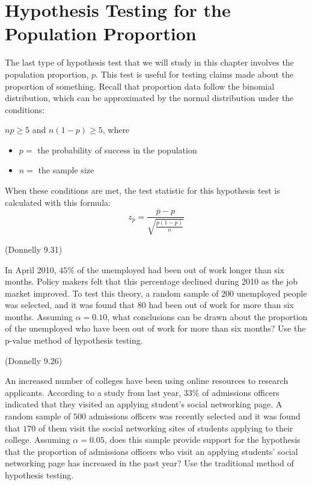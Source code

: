 \documentclass[12pt, letterpaper]{article}
\newcounter{exercise}
\theoremstyle{definition}
\begin{document}
\vfill

\newpage

\section*{Hypothesis Testing for the Population Proportion}

\noindent The last type of hypothesis test that we will study in this chapter involves the population proportion, $p$.  This test is useful for testing claims made about the proportion of something.  Recall that proportion data follow the binomial distribution, which can be approximated by the normal distribution under the conditions:
\begin{center}
$np\geq 5$ and $n(1-p)\geq 5$, where
\begin{itemize}
\item $p=$ the probability of success in the population
\item $n=$ the sample size
\end{itemize}
\end{center}

When these conditions are met, the test statistic for this hypothesis test is calculated with this formula:
$$ z_p = \frac{\overline{p}-p}{\sqrt{\frac{p(1-p)}{n}}} $$

\begin{exercise}  (Donnelly 9.31)

In April 2010, $45\%$ of the unemployed had been out of work longer than six months.  Policy makers felt that this percentage declined during 2010 as the job market improved.  To test this theory, a random sample of $200$ unemployed people was selected, and it was found that $80$ had been out of work for more than six months.  Assuming $\alpha = 0.10$, what conclusions can be drawn about the proportion of the unemployed who have been out of work for more than six months?  Use the p-value method of hypothesis testing.

\end{exercise}

\vfill

\newpage

\begin{exercise}  (Donnelly 9.26)

An increased number of colleges have been using online resources to research applicants.  According to a study from last year, $33\%$ of admissions officers indicated that they visited an applying student's social networking page.  A random sample of $500$ admissions officers was recently selected and it was found that $170$ of them visit the social networking sites of students applying to their college.  Assuming $\alpha = 0.05$, does this sample provide support for the hypothesis that the proportion of admissions officers who visit an applying students' social networking page has increased in the past year?  Use the traditional method of hypothesis testing.

\end{exercise}

\vfill
\end{document}
